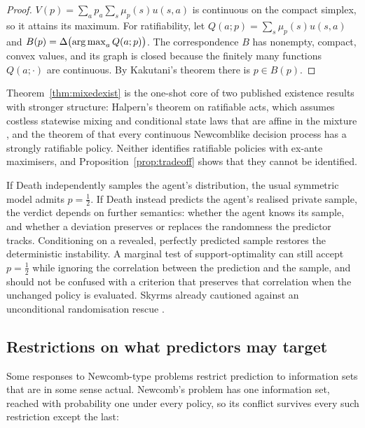 \begin{proof}
$V(p)=\sum_ap_a\sum_s\mu_p(s)u(s,a)$ is continuous on the compact simplex, so it attains its maximum.
For ratifiability, let $Q(a;p)=\sum_s\mu_p(s)u(s,a)$ and $B(p)=\Delta\bigl(\operatorname*{arg\,max}_aQ(a;p)\bigr)$. The
correspondence $B$ has nonempty, compact, convex values, and its graph is closed because the
finitely many functions $Q(a;\cdot)$ are continuous. By Kakutani's theorem
\autocite{kakutani1941} there is $p\in B(p)$.
\end{proof}

Theorem~\ref{thm:mixedexist} is the one-shot core of two published existence results with
stronger structure: Halpern's theorem on ratifiable acts, which assumes costless statewise mixing
and conditional state laws that are affine in the mixture \autocite{halpern2020}, and the theorem of
\textcite{belletal2021} that every continuous Newcomblike decision process has a strongly ratifiable
policy. Neither identifies ratifiable policies with ex-ante maximisers, and
Proposition~\ref{prop:tradeoff} shows that they cannot be identified.

\begin{remark}\label{rem:samples}
If Death independently samples the agent's distribution, the usual symmetric model admits
$p=\tfrac12$. If Death instead predicts the agent's realised private sample, the verdict depends on
further semantics: whether the agent knows its sample, and whether a deviation preserves or
replaces the randomness the predictor tracks. Conditioning on a revealed, perfectly predicted
sample restores the deterministic instability. A marginal test of support-optimality can still
accept $p=\tfrac12$ while ignoring the correlation between the prediction and the sample, and should
not be confused with a criterion that preserves that correlation when the unchanged policy is
evaluated. Skyrms already cautioned against an unconditional randomisation rescue
\autocite{skyrms1990ratif}.
\end{remark}

\subsection{Restrictions on what predictors may target}\label{sec:targets}

Some responses to Newcomb-type problems restrict prediction to information sets that are in some
sense actual. Newcomb's problem has one information set, reached with probability one under every
policy, so its conflict survives every such restriction except the last:

